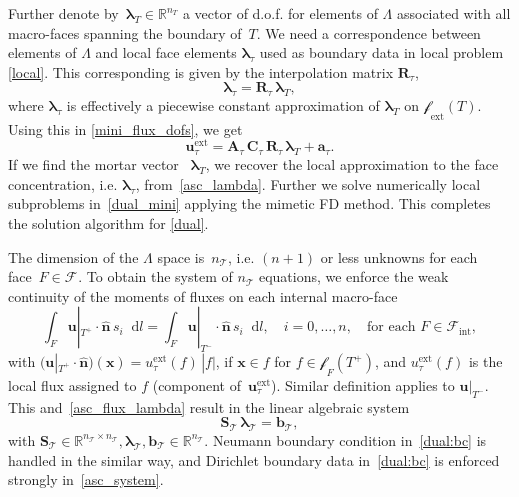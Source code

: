 \documentclass[12pt]{article}
\newcommand{\vect}[1]{\boldsymbol{\mathbf{#1}}}
\newcommand{\bcell}{T}
\newcommand{\bmesh}{{\vect{\mathcal T}}}
\newcommand{\mmesh}{{\vect{\mathcal \tau}}}
\newcommand{\bfaces}[1][]{{\vect{\mathcal F}_{\text{#1}}}}
\newcommand{\mfaces}[1][]{{\vect{\mathcal f}_{\text{#1}}}}
\newcommand{\Rn}[1]{{\mathbb R^{#1}}}
\newcommand*\diff{\mathop{}\!\mathrm{d}}
\begin{document}
	Further denote by~${{\vect \lambda}_\bcell \in \Rn{n_\bcell}}$ a vector of d.o.f. for elements of $\Lambda$ associated with all macro-faces spanning the boundary of~$\bcell$. We need a correspondence between elements of $\Lambda$ and local face elements $\vect \lambda_\mmesh$ used as boundary data in local problem \eqref{local}.
	This corresponding is given by the interpolation matrix $ \vect R_\mmesh$,
	\begin{equation}\label{asc_lambda}
		{\vect \lambda}_\mmesh = \vect R_\mmesh\,{\vect \lambda}_\bcell,
	\end{equation}
	where ${\vect \lambda}_\mmesh$ is effectively a piecewise constant approximation of ${\vect \lambda}_\bcell$ on $\mfaces_{\text{ext}}(T)$.
	Using this in \eqref{mini_flux_dofs}, we get
	\begin{equation}\label{asc_flux_lambda}
		{\vect u}^\text{ext}_\mmesh = \vect A_\mmesh\,\vect C_\mmesh\,\vect R_\mmesh\,{\vect \lambda}_\bcell + {\vect a}_\mmesh.
	\end{equation}
	If we find the mortar vector ~${\vect \lambda}_\bcell$, we recover the local approximation to the face concentration, i.e. ${\vect \lambda}_\mmesh$, from~\eqref{asc_lambda}.
	Further we solve numerically local subproblems in~\eqref{dual_mini} applying the mimetic FD method. This completes the solution algorithm for \eqref{dual}.
	
	The dimension of the $\Lambda$ space is~$n_\bmesh$, i.e. $(n+1)$ or less unknowns for each face~${F \in \bfaces}$.
	To obtain the system of $n_\bmesh$ equations, we enforce the weak continuity of the moments of  fluxes  on each internal macro-face
	\begin{equation}\label{flux_cont}
		\int_F \vect u|_{\bcell^+}\cdot\hat{\vect n}\,s_i \diff l = \int_F \vect u|_{\bcell^-}\cdot\hat{\vect n}\,s_i \diff l, \quad i = 0, \dots, n, \quad \text{for each } F \in \bfaces[int],
	\end{equation}
	with $\big(\vect u|_{\bcell^+}\cdot\hat{\vect n}\big)(\vect x) = u^\text{ext}_\mmesh(f)\,|f|$, if $\vect x \in f$ for $f\in\mfaces_F(T^+)$, and $u^\text{ext}_\mmesh(f)$ is the local flux assigned to $f$ (component of~$\vect u^\text{ext}_\mmesh$). Similar definition applies to $\vect u|_{\bcell^-}$. 	
	This and~\eqref{asc_flux_lambda} result in the linear algebraic system
	\begin{equation}\label{asc_system}
		\vect S_\bmesh\,{\vect \lambda}_\bmesh = {\vect b}_\bmesh,
	\end{equation}
	with	$\vect S_\bmesh \in \Rn{n_\bmesh \times n_\bmesh}, {\vect \lambda}_\bmesh, {\vect b}_\bmesh \in \Rn{n_\bmesh}$.
	Neumann boundary condition in~\eqref{dual:bc} is handled in the similar way, and Dirichlet boundary data in~\eqref{dual:bc} is enforced strongly in~\eqref{asc_system}.
	
\end{document}
